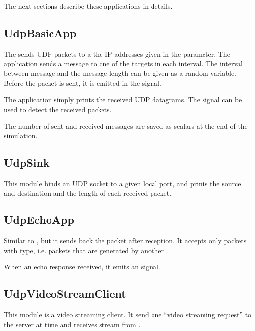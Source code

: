 The next sections describe these applications in details.

\subsection{UdpBasicApp}

The  sends UDP packets to a the IP addresses given in the
 parameter. The application sends a message to one of the
targets in each  interval. The interval between message and
the message length can be given as a random variable. Before the packet is
sent, it is emitted in the  signal.

The application simply prints the received UDP datagrams. The 
signal can be used to detect the received packets.

The number of sent and received messages are saved as scalars at the end of the
simulation.


\subsection{UdpSink}

This module binds an UDP socket to a given local port, and prints the
source and destination and the length of each received packet.


\subsection{UdpEchoApp}

Similar to , but it sends back the packet after reception.
It accepts only packets with  type, i.e. packets that
are generated by another .

When an echo response received, it emits an  signal.

\subsection{UdpVideoStreamClient}

This module is a video streaming client. It send one ``video streaming request'' to
the server at time  and receives stream from .

